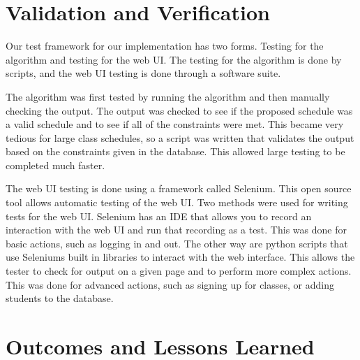 \documentclass[12pt,article]{memoir}
\begin{document}
\chapter{Validation and Verification} %
Our test framework for our implementation has two forms. Testing for the algorithm and testing for the web UI. The testing for the algorithm is done by scripts, and the web UI testing is done through a software suite.

The algorithm was first tested by running the algorithm and then manually checking the output. The output was checked to see if the proposed schedule was a valid schedule and to see if all of the constraints were met. This became very tedious for large class schedules, so a script was written that validates the output based on the constraints given in the database. This allowed large testing to be completed much faster.

The web UI testing is done using a framework called Selenium. This open source tool allows automatic testing of the web UI. Two methods were used for writing tests for the web UI. Selenium has an IDE that allows you to record an interaction with the web UI and
run that recording as a test. This was done for basic actions, such as logging in and out. The other way are python scripts that use Seleniums built in libraries to interact with the web interface. This allows the tester to check for output on a given page and to
perform more complex actions. This was done for advanced actions, such as signing up for classes, or adding students to the database.
\chapter{Outcomes and Lessons Learned} %
\end{document}
